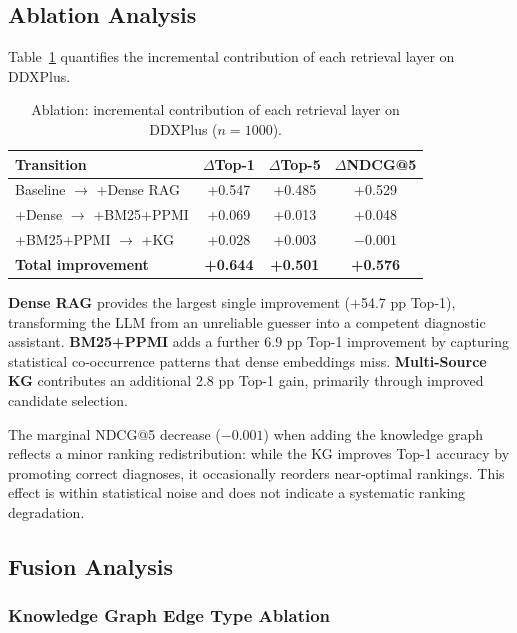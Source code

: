 \documentclass[preprint,12pt]{elsarticle}
\begin{document}
\subsection{Ablation Analysis}
\label{sec:ablation}

Table~\ref{tab:ablation} quantifies the incremental contribution of each retrieval layer on DDXPlus.

\begin{table}[t]
\centering
\caption{Ablation: incremental contribution of each retrieval layer on DDXPlus ($n{=}1000$).}
\label{tab:ablation}
\begin{tabular}{lccc}
\toprule
\textbf{Transition} & \textbf{$\Delta$Top-1} & \textbf{$\Delta$Top-5} & \textbf{$\Delta$NDCG@5} \\
\midrule
Baseline $\to$ +Dense RAG    & +0.547 & +0.485 & +0.529 \\
+Dense $\to$ +BM25+PPMI      & +0.069 & +0.013 & +0.048 \\
+BM25+PPMI $\to$ +KG         & +0.028 & +0.003 & $-0.001$ \\
\midrule
\textbf{Total improvement}   & \textbf{+0.644} & \textbf{+0.501} & \textbf{+0.576} \\
\bottomrule
\end{tabular}
\end{table}

\textbf{Dense RAG} provides the largest single improvement (+54.7 pp Top-1), transforming the LLM from an unreliable guesser into a competent diagnostic assistant. \textbf{BM25+PPMI} adds a further 6.9 pp Top-1 improvement by capturing statistical co-occurrence patterns that dense embeddings miss. \textbf{Multi-Source KG} contributes an additional 2.8 pp Top-1 gain, primarily through improved candidate selection.

The marginal NDCG@5 decrease ($-0.001$) when adding the knowledge graph reflects a minor ranking redistribution: while the KG improves Top-1 accuracy by promoting correct diagnoses, it occasionally reorders near-optimal rankings. This effect is within statistical noise and does not indicate a systematic ranking degradation.

\subsection{Fusion Analysis}
\label{sec:fusion_analysis}

\subsubsection{Knowledge Graph Edge Type Ablation}
\end{document}
